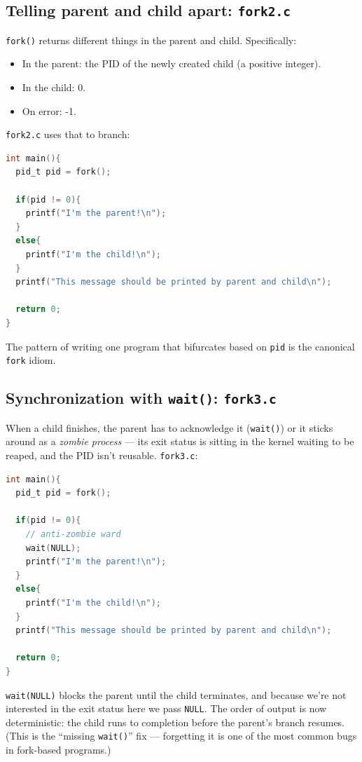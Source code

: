 \documentclass[11pt]{article}
\begin{document}
\subsection*{Telling parent and child apart: \texttt{fork2.c}}

\texttt{fork()} returns different things in the parent and child.
Specifically:
\begin{itemize}
  \item In the parent: the PID of the newly created child (a positive
    integer).
  \item In the child: 0.
  \item On error: -1.
\end{itemize}

\texttt{fork2.c} uses that to branch:

\begin{lstlisting}[language=C]
int main(){
  pid_t pid = fork();

  if(pid != 0){
    printf("I'm the parent!\n");
  }
  else{
    printf("I'm the child!\n");
  }
  printf("This message should be printed by parent and child\n");

  return 0;
}
\end{lstlisting}

The pattern of writing one program that bifurcates based on
\texttt{pid} is the canonical \texttt{fork} idiom.

\subsection*{Synchronization with \texttt{wait()}: \texttt{fork3.c}}

When a child finishes, the parent has to acknowledge it
(\texttt{wait()}) or it sticks around as a \emph{zombie process} ---
its exit status is sitting in the kernel waiting to be reaped, and the
PID isn't reusable. \texttt{fork3.c}:

\begin{lstlisting}[language=C]
int main(){
  pid_t pid = fork();

  if(pid != 0){
    // anti-zombie ward
    wait(NULL);
    printf("I'm the parent!\n");
  }
  else{
    printf("I'm the child!\n");
  }
  printf("This message should be printed by parent and child\n");

  return 0;
}
\end{lstlisting}

\texttt{wait(NULL)} blocks the parent until the child terminates, and
because we're not interested in the exit status here we pass
\texttt{NULL}. The order of output is now deterministic: the child
runs to completion before the parent's branch resumes. (This is the
``missing \texttt{wait()}'' fix --- forgetting it is one of the most
common bugs in fork-based programs.)
\end{document}
